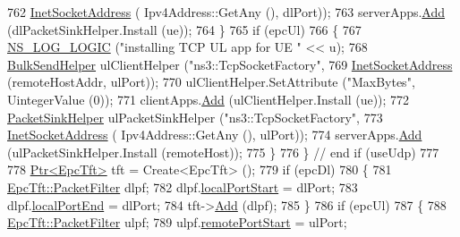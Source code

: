 \begin{DoxyCode}
762                                                            \hyperlink{classns3_1_1InetSocketAddress}{InetSocketAddress} (
      Ipv4Address::GetAny (), dlPort));
763                       serverApps.\hyperlink{classns3_1_1ApplicationContainer_ad09ab1a1ad5849d518d5f4c262e38152}{Add} (dlPacketSinkHelper.Install (ue));
764                     \}
765                   \textcolor{keywordflow}{if} (epcUl)
766                     \{
767                       \hyperlink{group__logging_ga88acd260151caf2db9c0fc84997f45ce}{NS\_LOG\_LOGIC} (\textcolor{stringliteral}{"installing TCP UL app for UE "} << u);
768                       \hyperlink{classns3_1_1BulkSendHelper}{BulkSendHelper} ulClientHelper (\textcolor{stringliteral}{"ns3::TcpSocketFactory"},
769                                                      \hyperlink{classns3_1_1InetSocketAddress}{InetSocketAddress} (remoteHostAddr, 
      ulPort));
770                       ulClientHelper.SetAttribute (\textcolor{stringliteral}{"MaxBytes"}, UintegerValue (0));
771                       clientApps.\hyperlink{classns3_1_1ApplicationContainer_ad09ab1a1ad5849d518d5f4c262e38152}{Add} (ulClientHelper.Install (ue));
772                       \hyperlink{classns3_1_1PacketSinkHelper}{PacketSinkHelper} ulPacketSinkHelper (\textcolor{stringliteral}{"ns3::TcpSocketFactory"}, 
773                                                            \hyperlink{classns3_1_1InetSocketAddress}{InetSocketAddress} (
      Ipv4Address::GetAny (), ulPort));
774                       serverApps.\hyperlink{classns3_1_1ApplicationContainer_ad09ab1a1ad5849d518d5f4c262e38152}{Add} (ulPacketSinkHelper.Install (remoteHost));
775                     \}
776                 \} \textcolor{comment}{// end if (useUdp)}
777 
778               \hyperlink{classns3_1_1Ptr}{Ptr<EpcTft>} tft = Create<EpcTft> ();
779               \textcolor{keywordflow}{if} (epcDl)
780                 \{
781                   \hyperlink{structns3_1_1EpcTft_1_1PacketFilter}{EpcTft::PacketFilter} dlpf;
782                   dlpf.\hyperlink{structns3_1_1EpcTft_1_1PacketFilter_afd505cda437b1687abc4432a8bcefbaf}{localPortStart} = dlPort;
783                   dlpf.\hyperlink{structns3_1_1EpcTft_1_1PacketFilter_a3236947a93fdd516b1d978467eaa0484}{localPortEnd} = dlPort;
784                   tft->\hyperlink{classns3_1_1EpcTft_a1228456a8abbe48cbc89bbe2d2e9af48}{Add} (dlpf); 
785                 \}
786               \textcolor{keywordflow}{if} (epcUl)
787                 \{
788                   \hyperlink{structns3_1_1EpcTft_1_1PacketFilter}{EpcTft::PacketFilter} ulpf;
789                   ulpf.\hyperlink{structns3_1_1EpcTft_1_1PacketFilter_aa96ab9356c91b14059220d00155c32b5}{remotePortStart} = ulPort;

\end{DoxyCode}
